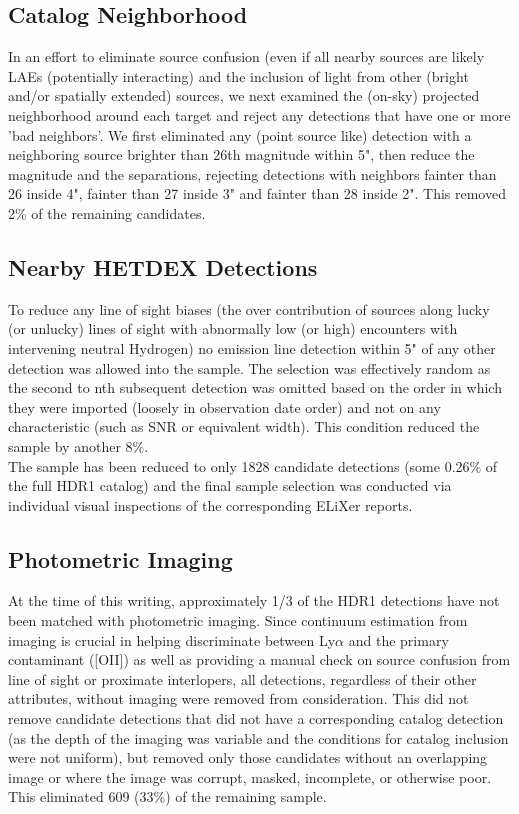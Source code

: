 \documentclass{aastex62}
\begin{document}
\subsection{Catalog Neighborhood}  \label{sec:catalog_neighbors}
In an effort to eliminate source confusion (even if all nearby sources are likely LAEs (potentially interacting) and the inclusion of light from other (bright and/or spatially extended) sources, we next examined the (on-sky) projected neighborhood around each target and reject any detections that have one or more 'bad neighbors'. We first eliminated any (point source like) detection with a neighboring source brighter than 26th magnitude within 5", then reduce the magnitude and the separations, rejecting detections with neighbors fainter than 26 inside 4", fainter than 27 inside 3" and fainter than 28 inside 2". This removed 2\% of the remaining candidates.


\subsection{Nearby HETDEX Detections}
To reduce any line of sight biases (the over contribution of sources along lucky (or unlucky) lines of sight with abnormally low (or high) encounters with intervening neutral Hydrogen) no emission line detection within 5" of any other detection was allowed into the sample. The selection was effectively random as the second to nth subsequent detection was omitted based on the order in which they were imported (loosely in observation date order) and not on any characteristic (such as SNR or equivalent width). This condition reduced the sample by another 8\%.\\

The sample has been reduced to only 1828 candidate detections (some 0.26\% of the full HDR1 catalog) and the final sample selection was conducted via individual visual inspections of the corresponding ELiXer reports.

\subsection{Photometric Imaging}
At the time of this writing, approximately 1/3 of the HDR1 detections have not been matched with photometric imaging. Since continuum estimation from imaging is crucial in helping discriminate between Ly$\alpha$ and the primary contaminant ([OII]) as well as providing a manual check on source confusion from line of sight or proximate interlopers, all detections, regardless of their other attributes, without imaging were removed from consideration. This did not remove candidate detections that did not have a corresponding catalog detection (as the depth of the imaging was variable and the conditions for catalog inclusion were not uniform), but removed only those candidates without an overlapping image or where the image was corrupt, masked, incomplete, or otherwise poor. This eliminated 609 (33\%) of the remaining sample.
\end{document}
